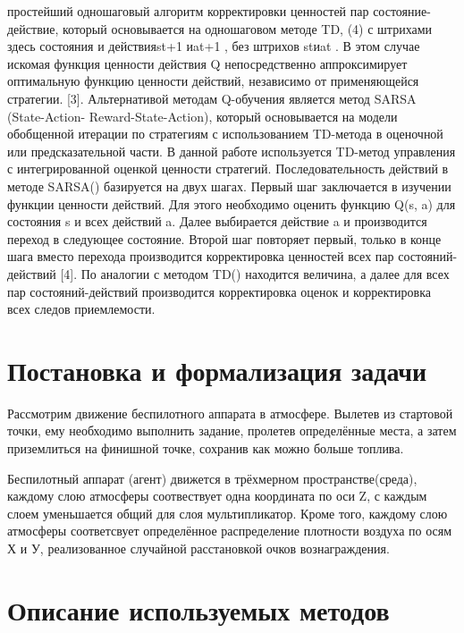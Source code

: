 \documentclass[12pt, a4paper]{report}
\theoremstyle{definition}
\theoremstyle{plain}
\theoremstyle{remark}
\theoremstyle{remark}
\theoremstyle{definition}
\begin{document}
простейший одношаговый алгоритм корректировки ценностей пар состояние- действие, который основывается на одношаговом методе TD, (4) с штрихами здесь состояния и действияst+1 иat+1 , без штрихов stиat . В этом случае искомая функция ценности действия Q непосредственно аппроксимирует оптимальную функцию ценности действий, независимо от применяющейся стратегии. [3].
Альтернативой методам Q-обучения является метод SARSA (State-Action- Reward-State-Action), который основывается на модели обобщенной итерации по стратегиям с использованием TD-метода в оценочной или предсказательной
части. В данной работе используется TD-метод управления с интегрированной оценкой ценности стратегий. Последовательность действий в методе SARSA() базируется на двух шагах. Первый шаг заключается в изучении функции ценности действий. Для этого необходимо оценить функцию Q(s, a) для состояния s и всех действий a. Далее выбирается действие a и производится переход в следующее состояние. Второй шаг повторяет первый, только в конце
шага вместо перехода производится корректировка ценностей всех пар состояний-действий [4]. По аналогии с методом TD() находится величина, а далее для всех пар состояний-действий производится корректировка оценок и корректировка всех следов приемлемости.

\section{Постановка и формализация задачи}

Рассмотрим движение беспилотного аппарата в атмосфере. Вылетев из стартовой точки, ему необходимо выполнить задание, пролетев определённые места, а затем приземлиться на финишной точке, сохранив как можно больше топлива.

Беспилотный аппарат (агент) движется в трёхмерном пространстве(среда), каждому слою атмосферы соотвествует одна координата по оси Z, с каждым слоем уменьшается общий для слоя мультипликатор. Кроме того, каждому слою атмосферы соответсвует определённое распределение плотности воздуха по осям Х и У, реализованное случайной расстановкой очков вознаграждения.


\section{Описание используемых методов}
\end{document}
